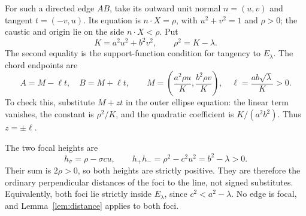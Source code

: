 \documentclass[10pt]{article}
\begin{document}
For such a directed edge $A B$, take its outward unit normal
$n=(u,v)$ and tangent $t=(-v,u)$. Its equation is
$n\cdot X=\rho$, with $u^2+v^2=1$ and $\rho>0$; the caustic and
origin lie on the side $n\cdot X<\rho$. Put
\begin{equation}\label{eq:K}
 K=a^2u^2+b^2v^2,\qquad \rho^2=K-\lambda.
\end{equation}
The second equality is the support-function condition for tangency
to $E_\lambda$. The chord endpoints are
\begin{equation}\label{eq:chord}
 A=M-\ell t,\quad B=M+\ell t,\qquad
 M=\left(\frac{a^2\rho u}{K},\frac{b^2\rho v}{K}\right),
 \quad \ell=\frac{ab\sqrt\lambda}{K}>0.
\end{equation}
To check this, substitute $M+z t$ in the outer ellipse equation:
the linear term vanishes, the constant is $\rho^2/K$, and the
quadratic coefficient is $K/(a^2b^2)$. Thus $z=\pm\ell$.

The two focal heights are
\begin{equation}\label{eq:heights}
 h_\sigma=\rho-\sigma cu,
 \qquad h_+h_-=\rho^2-c^2u^2=b^2-\lambda>0.
\end{equation}
Their sum is $2\rho>0$, so both heights are strictly positive.
They are therefore the ordinary perpendicular distances of the foci
to the line, not signed substitutes. Equivalently, both foci lie strictly
inside $E_\lambda$, since $c^2<a^2-\lambda$.
No edge is focal, and Lemma~\ref{lem:distance} applies to both foci.
\end{document}
